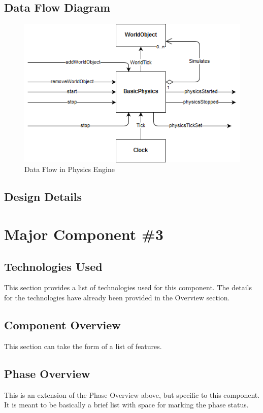 \subsection{Data Flow Diagram}

 \begin{figure}
 	\begin{center}
 	\includegraphics[scale=0.5]{./images_design/uml/DataFlow_physics}
 	\caption{Data Flow in Physics Engine\label{uml:dataflow_physics}}
 	\end{center}
 \end{figure}

\subsection{Design Details}


\section{Major Component \#3 }

\subsection{Technologies  Used}
This section provides a list of technologies used for this component.  The details 
for the technologies have already been provided in the Overview section. 

\subsection{Component  Overview}
This section can take the form of a list of features. 

\subsection{Phase Overview}
This is an extension of the Phase Overview above, but specific to this component. 
 It is meant to be basically a brief list with space for marking the phase status. 

